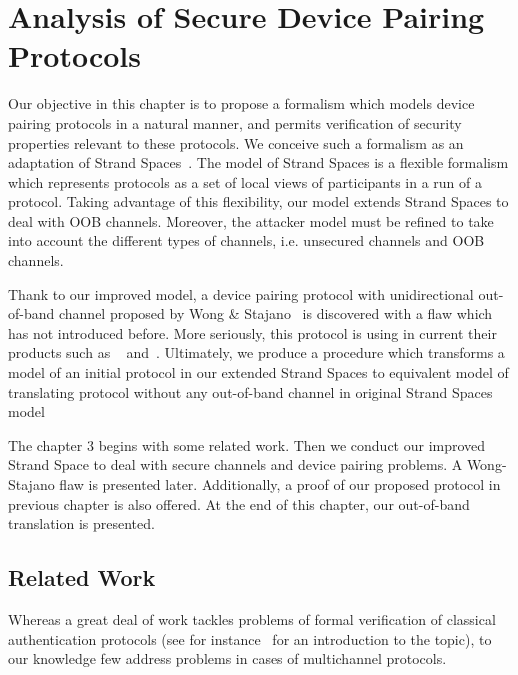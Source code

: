 
\chapter{Analysis of Secure Device Pairing Protocols} %

\label{Analysis of Secure Device Pairing Protocols} %


Our objective in this chapter is to propose a formalism which models device pairing protocols 
in a natural manner, and permits verification of security properties relevant to these protocols.
We conceive such a formalism as an adaptation of Strand Spaces~\cite{674832}. The model of Strand Spaces is a flexible formalism which represents protocols as a set of local views of participants in a run of a protocol. Taking advantage of this flexibility, our model extends Strand Spaces to deal with OOB channels. Moreover, the attacker model must be refined to take into account the different types of channels, i.e. unsecured channels and OOB channels.

Thank to our improved model, a device pairing protocol with unidirectional out-of-band channel proposed by Wong \& Stajano~\cite{10.1109/MPRV.2007.76} is discovered with a flaw which has not introduced before. More seriously, this protocol is using in current their products such as ~\cite{Stajano:2011aa} and~\cite{Stajano:2014aa}. Ultimately, we produce a procedure which transforms a model of an initial protocol in our extended Strand Spaces to equivalent model of translating protocol without any out-of-band channel in original Strand Spaces model

The chapter 3 begins with some related work. Then we conduct our improved Strand Space to deal with secure channels and device pairing problems. A Wong-Stajano flaw is presented later. Additionally, a proof of our proposed protocol in previous chapter is also offered. At the end of this chapter, our out-of-band translation is presented. 

\section{Related Work}
Whereas a great deal of work tackles problems of formal verification of classical authentication protocols (see for instance~\cite{Ryan:2000:MAS:1407727} for an introduction to the topic), to our knowledge few address problems in cases of multichannel protocols.

